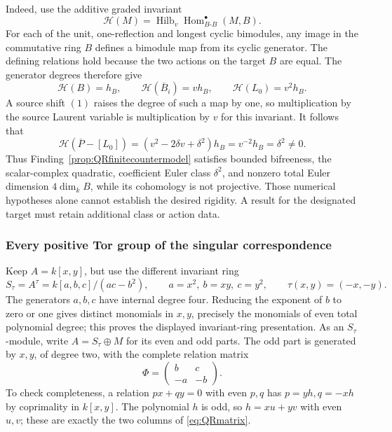 Indeed, use the additive graded invariant
\[
 \mathcal H(M)=\operatorname{Hilb}_v
                  \operatorname{Hom}_{B\text{-}B}^{\bullet}(M,B).
\]
For each of the unit, one-reflection and longest
cyclic bimodules, any image in the commutative ring
\(B\) defines a bimodule map from its cyclic generator.
The defining relations hold because the two actions
on the target \(B\) are equal. The generator degrees
therefore give
\[
 \mathcal H(B)=h_B,
 \qquad\mathcal H(\overline B_i)=v h_B,
 \qquad\mathcal H(L_0)=v^2h_B.
\]
A source shift \((1)\) raises the degree of such a
map by one, so multiplication by the source Laurent
variable is multiplication by \(v\) for this invariant.
It follows that
\begin{equation}\label{eq:QRclassseparation}
 \mathcal H(\overline P-[L_0])
    =(v^2-2\delta v+\delta^2)h_B
    =v^{-2}h_B=\delta^2\ne0.
\end{equation}
Thus Finding~\ref{prop:QRfinitecountermodel}
satisfies bounded bifreeness, the scalar-complex
quadratic, coefficient Euler class \(\delta^2\),
and nonzero total Euler dimension \(4\dim_k B\),
while its cohomology is not projective.
Those numerical hypotheses alone cannot establish
the desired rigidity. A result for the designated
target must retain additional class or action data.

\subsubsection{Every positive Tor group of the singular correspondence}

Keep \(A=k[x,y]\), but use the different invariant ring
\begin{equation}\label{eq:QRsingularring}
 S_\tau=A^\tau=k[a,b,c]/(ac-b^2),
 \qquad a=x^2,\ b=xy,\ c=y^2,
 \qquad \tau(x,y)=(-x,-y).
\end{equation}
The generators \(a,b,c\) have internal degree four.
Reducing the exponent of \(b\) to zero or one
gives distinct monomials in \(x,y\), precisely the
monomials of even total polynomial degree; this
proves the displayed invariant-ring presentation.
As an \(S_\tau\)-module, write
\(A=S_\tau\oplus M\) for its even and odd parts.
The odd part is generated by \(x,y\), of degree two,
with the complete relation matrix
\begin{equation}\label{eq:QRmatrix}
            \Phi=\begin{pmatrix}b&c\\-a&-b\end{pmatrix}.
\end{equation}
To check completeness, a relation \(px+qy=0\)
with even \(p,q\) has \(p=yh,q=-xh\) by coprimality
in \(k[x,y]\). The polynomial \(h\) is odd, so
\(h=xu+yv\) with even \(u,v\); these are exactly
the two columns of \eqref{eq:QRmatrix}.

